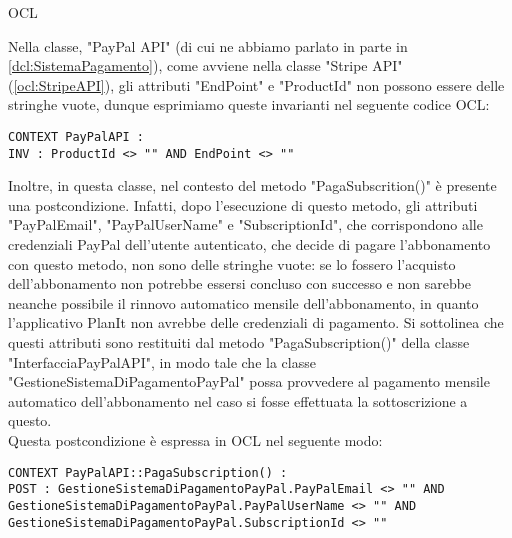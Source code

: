 \begin{listaPersonale}{OCL}
    \begin{center}
        
    \end{center}
    Nella classe, "PayPal API" (di cui ne abbiamo parlato in parte in \ref{dcl:SistemaPagamento}), come avviene nella classe "Stripe API" (\ref{ocl:StripeAPI}), gli attributi "EndPoint" e "ProductId" non possono essere delle stringhe vuote, dunque esprimiamo queste invarianti nel seguente codice OCL:
    \begin{lstlisting}
CONTEXT PayPalAPI :
INV : ProductId <> "" AND EndPoint <> ""
    \end{lstlisting}
    Inoltre, in questa classe, nel contesto del metodo "PagaSubscrition()" è presente una postcondizione. Infatti, dopo l'esecuzione di questo metodo, gli attributi "PayPalEmail", "PayPalUserName" e "SubscriptionId", che corrispondono alle credenziali PayPal dell'utente autenticato, che decide di pagare l'abbonamento con questo metodo, non sono delle stringhe vuote: se lo fossero l'acquisto dell'abbonamento non potrebbe essersi concluso con successo e non sarebbe neanche possibile il rinnovo automatico mensile dell'abbonamento, in quanto l'applicativo PlanIt non avrebbe delle credenziali di pagamento. Si sottolinea che questi attributi sono restituiti dal metodo "PagaSubscription()" della classe "InterfacciaPayPalAPI", in modo tale che la classe "GestioneSistemaDiPagamentoPayPal" possa provvedere al pagamento mensile automatico dell'abbonamento nel caso si fosse effettuata la sottoscrizione a questo.\\
    Questa postcondizione è espressa in OCL nel seguente modo:
    \begin{lstlisting}
CONTEXT PayPalAPI::PagaSubscription() :
POST : GestioneSistemaDiPagamentoPayPal.PayPalEmail <> "" AND GestioneSistemaDiPagamentoPayPal.PayPalUserName <> "" AND GestioneSistemaDiPagamentoPayPal.SubscriptionId <> ""
    \end{lstlisting}
    \newpage





\end{listaPersonale}

